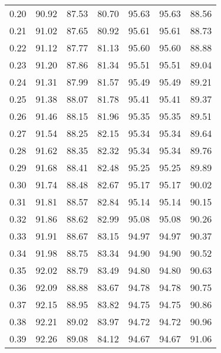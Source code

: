 \begin{tabular}{|c|c|c|c|c|c|c|}
      0.20 &     90.92 &     87.53 &      80.70 &   95.63 &      95.63 &         88.56 \\
      0.21 &     91.02 &     87.65 &      80.92 &   95.61 &      95.61 &         88.73 \\
      0.22 &     91.12 &     87.77 &      81.13 &   95.60 &      95.60 &         88.88 \\
      0.23 &     91.20 &     87.86 &      81.34 &   95.51 &      95.51 &         89.04 \\
      0.24 &     91.31 &     87.99 &      81.57 &   95.49 &      95.49 &         89.21 \\
      0.25 &     91.38 &     88.07 &      81.78 &   95.41 &      95.41 &         89.37 \\
      0.26 &     91.46 &     88.15 &      81.96 &   95.35 &      95.35 &         89.51 \\
      0.27 &     91.54 &     88.25 &      82.15 &   95.34 &      95.34 &         89.64 \\
      0.28 &     91.62 &     88.35 &      82.32 &   95.34 &      95.34 &         89.76 \\
      0.29 &     91.68 &     88.41 &      82.48 &   95.25 &      95.25 &         89.89 \\
      0.30 &     91.74 &     88.48 &      82.67 &   95.17 &      95.17 &         90.02 \\
      0.31 &     91.81 &     88.57 &      82.84 &   95.14 &      95.14 &         90.15 \\
      0.32 &     91.86 &     88.62 &      82.99 &   95.08 &      95.08 &         90.26 \\
      0.33 &     91.91 &     88.67 &      83.15 &   94.97 &      94.97 &         90.37 \\
      0.34 &     91.98 &     88.75 &      83.34 &   94.90 &      94.90 &         90.52 \\
      0.35 &     92.02 &     88.79 &      83.49 &   94.80 &      94.80 &         90.63 \\
      0.36 &     92.09 &     88.88 &      83.67 &   94.78 &      94.78 &         90.75 \\
      0.37 &     92.15 &     88.95 &      83.82 &   94.75 &      94.75 &         90.86 \\
      0.38 &     92.21 &     89.02 &      83.97 &   94.72 &      94.72 &         90.96 \\
      0.39 &     92.26 &     89.08 &      84.12 &   94.67 &      94.67 &         91.06 \\

\end{tabular}
